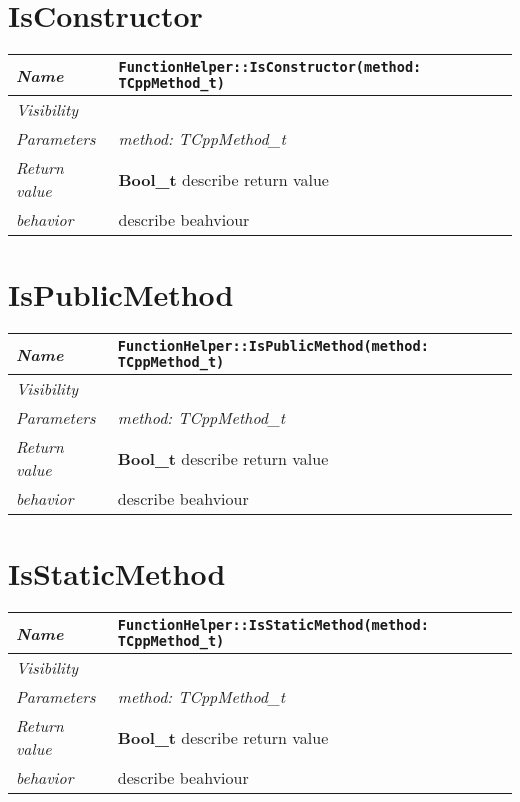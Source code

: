  \section{IsConstructor}
\begin{longtable}{p{3cm} @{\hskip 1cm} p{12cm}}
 \hline
\textit{Name} & \texttt{FunctionHelper::IsConstructor(method: TCppMethod_t)}\\
\hline
 \textit{Visibility} & \\
\hline
\textit{Parameters} & \textit{method: TCppMethod_t}\\
\hline
\textit{Return value} & \textbf{ Bool_t} describe return value\\
  \hline
 \textit{behavior} & describe beahviour \\
\hline
\end{longtable} \pagebreak
 \section{IsPublicMethod}
\begin{longtable}{p{3cm} @{\hskip 1cm} p{12cm}}
 \hline
\textit{Name} & \texttt{FunctionHelper::IsPublicMethod(method: TCppMethod_t)}\\
\hline
 \textit{Visibility} & \\
\hline
\textit{Parameters} & \textit{method: TCppMethod_t}\\
\hline
\textit{Return value} & \textbf{ Bool_t} describe return value\\
  \hline
 \textit{behavior} & describe beahviour \\
\hline
\end{longtable} \pagebreak
 \section{IsStaticMethod}
\begin{longtable}{p{3cm} @{\hskip 1cm} p{12cm}}
 \hline
\textit{Name} & \texttt{FunctionHelper::IsStaticMethod(method: TCppMethod_t)}\\
\hline
 \textit{Visibility} & \\
\hline
\textit{Parameters} & \textit{method: TCppMethod_t}\\
\hline
\textit{Return value} & \textbf{ Bool_t} describe return value\\
  \hline
 \textit{behavior} & describe beahviour \\
\hline
\end{longtable} \pagebreak
